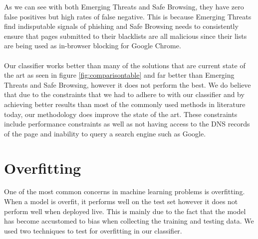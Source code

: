 \documentclass[12pt,twoside]{report}
\begin{document}
\noindent
As we can see with both Emerging Threats and Safe Browsing, they have zero false positives but high rates of false negative. This is because Emerging Threats find indisputable signals of phishing and Safe Browsing needs to consistently ensure that pages submitted to their blacklists are all malicious since their lists are being used as in-browser blocking for Google Chrome.
\\\\
Our classifier works better than many of the solutions that are current state of the art as seen in figure \ref{fig:comparisontable} and far better than Emerging Threats and Safe Browsing, however it does not perform the best. We do believe that due to the constraints that we had to adhere to with our classifier and by achieving better results than most of the commonly used methods in literature today, our methodology does improve the state of the art. These constraints include performance constraints as well as not having access to the DNS records of the page and inability to query a search engine such as Google.
\section{Overfitting}
One of the most common concerns in machine learning problems is overfitting. When a model is overfit, it performs well on the test set however it does not perform well when deployed live. This is mainly due to the fact that the model has become accustomed to bias when collecting the training and testing data. We used two techniques to test for overfitting in our classifier.
\end{document}
